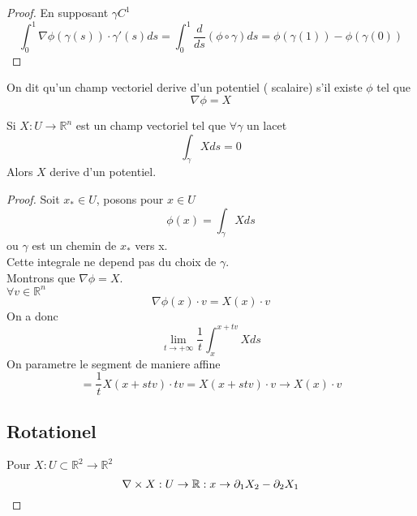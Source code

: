 \documentclass[../main.tex]{subfiles}
\begin{document}
\begin{proof}
	En supposant $\gamma C^1$ 
\[ 
\int_{ 0 }^{ 1 } \nabla\phi( \gamma( s) ) \cdot \gamma'( s) ds = \int_{ 0 }^{ 1 } \frac{d}{ds}( \phi\circ\gamma ) ds = \phi( \gamma( 1) ) -\phi( \gamma( 0) ) 
\]

\end{proof}
On dit qu'un champ vectoriel derive d'un potentiel ( scalaire) s'il existe $\phi$ tel que
\[ 
\nabla\phi= X
\]
\begin{propo}
Si $X:U\to \mathbb{R}^n$ est un champ vectoriel tel que $\forall \gamma$ un lacet
\[ 
\int_{ \gamma }^{  }X ds =0
\]
Alors $X$ derive d'un potentiel.
\end{propo}
\begin{proof}
Soit $x_*\in U$, posons pour $x\in U$ 
\[ 
\phi( x) = \int_{ \gamma} X ds
\]
ou $\gamma$ est un chemin de $x_*$ vers x.\\
Cette integrale ne depend pas du choix de $\gamma$.\\
Montrons que $\nabla \phi = X$.\\
$\forall v \in \mathbb{R}^n$ 
\[ 
\nabla\phi( x) \cdot v = X( x) \cdot v
\]
On a donc
\[ 
\lim_{t \to  + \infty} \frac{1}{t}\int_{ x }^{ x+tv } X ds
\]
On parametre le segment de maniere affine
\[ 
= \frac{1}{t} X( x+stv)\cdot tv= X( x+stv) \cdot v\to X( x) \cdot v	
\]
\subsection{Rotationel}
Pour $X:U \subset \mathbb{R}^{2}\to \mathbb{R}^{2}$ 
\[ 
\nabla\times X: U \to \mathbb{R} : x \to \partial_1X_2- \partial_2X_1
\]






\end{proof}


	
\end{document}
